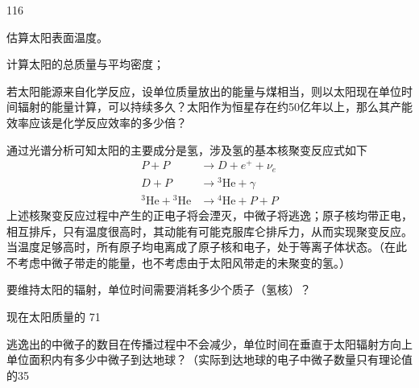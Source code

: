 \begin{problem}[第36届全国中学生物理竞赛决赛][构建太阳模型]{116}
\begin{subproblem}
        \begin{subsubproblem}
            估算太阳表面温度。
        \end{subsubproblem}
    \end{subproblem}
    \begin{subproblem}
        \begin{subsubproblem}
            计算太阳的总质量与平均密度；
        \end{subsubproblem}
        \begin{subsubproblem}
            若太阳能源来自化学反应，设单位质量放出的能量与煤相当，则以太阳现在单位时间辐射的能量计算，可以持续多久？太阳作为恒星存在约50亿年以上，那么其产能效率应该是化学反应效率的多少倍？
        \end{subsubproblem}
    \end{subproblem}
    \begin{subproblem}
        通过光谱分析可知太阳的主要成分是氢，涉及氢的基本核聚变反应式如下
        \begin{align}
            P + P &\rightarrow D + e^{+} + \nu_{e} \tag{a}\\
            D + P &\rightarrow {}^{3}\mathrm{He} + \gamma \tag{b}\\
            {}^{3}\mathrm{He} + {}^{3}\mathrm{He} &\rightarrow {}^{4}\mathrm{He} + P + P \tag{c}
        \end{align}
        上述核聚变反应过程中产生的正电子将会湮灭，中微子将逃逸；原子核均带正电，相互排斥，只有温度很高时，其动能有可能克服库仑排斥力，从而实现聚变反应。当温度足够高时，所有原子均电离成了原子核和电子，处于等离子体状态。（在此不考虑中微子带走的能量，也不考虑由于太阳风带走的未聚变的氢。）
        \begin{subsubproblem}
            要维持太阳的辐射，单位时间需要消耗多少个质子（氢核）？
        \end{subsubproblem}
        \begin{subsubproblem}
            现在太阳质量的 71%
        \end{subsubproblem}
        \begin{subsubproblem}
            逃逸出的中微子的数目在传播过程中不会减少，单位时间在垂直于太阳辐射方向上单位面积内有多少中微子到达地球？（实际到达地球的电子中微子数量只有理论值的35%

\end{subsubproblem}
\end{subproblem}
\end{problem}
